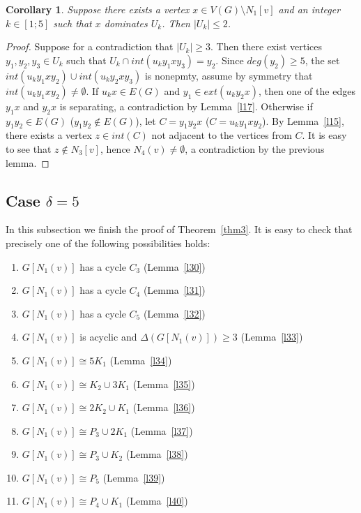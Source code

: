 \documentclass[12pt]{article}
\newtheorem{corollary}{Corollary}
\begin{document}
\begin{corollary}\label{cor2}
Suppose there exists a vertex $x \in V(G) \setminus N_1[v]$ and an integer $k \in [1;5]$ such that $x$ dominates $U_k$. Then $|U_k| \leq 2$.
\end{corollary}

\begin{proof}
Suppose for a contradiction that $|U_k| \geq 3$. Then there exist vertices $y_1,y_2,y_3 \in U_k$ such that $U_k \cap int(u_ky_1xy_3) = y_2$. Since $deg(y_2) \geq 5$, the set $int(u_ky_1xy_2) \cup int(u_ky_2xy_3)$ is nonepmty, assume by symmetry that $int(u_ky_1xy_2) \neq \emptyset$. If $u_kx \in E(G)$ and $y_1 \in ext(u_ky_2x)$, then one of the edges $y_1x$ and $y_2x$ is separating, a contradiction by Lemma~\ref{l17}. Otherwise if $y_1y_2 \in E(G)$ ($y_1y_2 \notin E(G)$), let $C = y_1y_2x$ ($C = u_ky_1xy_2$). By Lemma~\ref{l15}, there exists a vertex $z \in int(C)$ not adjacent to the vertices from $C$. It is easy to see that $z \notin N_3[v]$, hence $N_4(v) \neq \emptyset$, a contradiction by the previous lemma.
\end{proof}


\subsection{Case $\delta = 5$}

In this subsection we finish the proof of Theorem~\ref{thm3}. It is easy to check that precisely one of the following possibilities holds:

\begin{enumerate}
\item $G[N_1(v)]$ has a cycle $C_3$ (Lemma~\ref{l30})
\item $G[N_1(v)]$ has a cycle $C_4$ (Lemma~\ref{l31})
\item $G[N_1(v)]$ has a cycle $C_5$ (Lemma~\ref{l32})
\item $G[N_1(v)]$ is acyclic and $\Delta(G[N_1(v)]) \geq 3$ (Lemma~\ref{l33})
\item $G[N_1(v)] \cong 5K_1$ (Lemma~\ref{l34})
\item $G[N_1(v)] \cong K_2 \cup 3K_1$ (Lemma~\ref{l35})
\item $G[N_1(v)] \cong 2K_2 \cup K_1$ (Lemma~\ref{l36})
\item $G[N_1(v)] \cong P_3 \cup 2K_1$ (Lemma~\ref{l37})
\item $G[N_1(v)] \cong P_3 \cup K_2$ (Lemma~\ref{l38})
\item $G[N_1(v)] \cong P_5$ (Lemma~\ref{l39})
\item $G[N_1(v)] \cong P_4 \cup K_1$ (Lemma~\ref{l40})
\end{enumerate}
\end{document}
